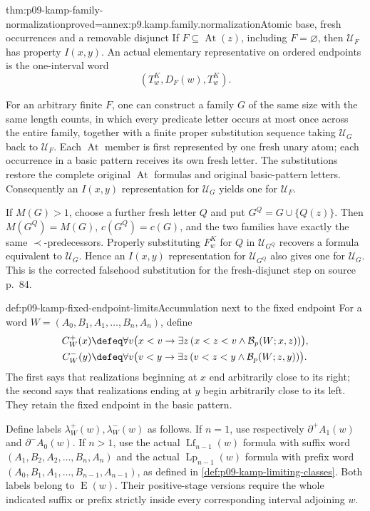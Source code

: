 \begin{hblemma}{thm:p09-kamp-family-normalization}{proved=annex:p9.kamp.family.normalization}{Atomic base, fresh occurrences and a removable disjunct}
If \(F\subseteq\operatorname{At}(z)\), including \(F=\varnothing\),
then \(\mathcal U_F\) has property \(I(x,y)\). An actual
elementary representative on ordered endpoints is the one-interval word
\[
                         (T^K_w,D_F(w),T^K_w).
\]

For an arbitrary finite \(F\), one can construct a family \(G\)
of the same size with the same length counts, in which every predicate
letter occurs at most once across the entire family, together with a
finite proper substitution sequence taking \(\mathcal U_G\)
back to \(\mathcal U_F\). Each \(\operatorname{At}\) member
is first represented by one fresh unary atom; each occurrence in a
basic pattern receives its own fresh letter. The substitutions restore
the complete original \(\operatorname{At}\) formulas and original
basic-pattern letters. Consequently an \(I(x,y)\) representation
for \(\mathcal U_G\) yields one for \(\mathcal U_F\).

If \(M(G)>1\), choose a further fresh letter \(Q\) and put
\(G^Q=G\cup\{Q(z)\}\). Then \(M(G^Q)=M(G)\), \(c(G^Q)=c(G)\),
and the two families have exactly the same \(\prec\)-predecessors.
Properly substituting \(F^K_w\) for \(Q\) in
\(\mathcal U_{G^Q}\) recovers a formula equivalent to
\(\mathcal U_G\). Hence an \(I(x,y)\) representation for
\(\mathcal U_{G^Q}\) also gives one for \(\mathcal U_G\).
This is the corrected falsehood substitution for the fresh-disjunct
step on source p.~84.
\end{hblemma}

\begin{hbdefinition}{def:p09-kamp-fixed-endpoint-limits}{Accumulation next to the fixed endpoint}
For a word \(W=(A_0,B_1,A_1,\ldots,B_n,A_n)\), define
\[
\begin{aligned}
 C_W^+(x)&\defeq\forall v\bigl(x<v\to
       \exists z\,(x<z<v\land\mathcal B_p(W;x,z))\bigr),\\
 C_W^-(y)&\defeq\forall v\bigl(v<y\to
       \exists z\,(v<z<y\land\mathcal B_p(W;z,y))\bigr).
\end{aligned}
\]
The first says that realizations beginning at \(x\) end
arbitrarily close to its right; the second says that realizations
ending at \(y\) begin arbitrarily close to its left.
They retain the fixed endpoint in the basic pattern.

Define labels \(\lambda_W^+(w),\lambda_W^-(w)\) as follows.
If \(n=1\), use respectively
\(\partial^+A_1(w)\) and \(\partial^-A_0(w)\).
If \(n>1\), use the actual \(\operatorname{Lf}_{n-1}(w)\)
formula with suffix word \((A_1,B_2,A_2,\ldots,B_n,A_n)\)
and the actual \(\operatorname{Lp}_{n-1}(w)\) formula with
prefix word \((A_0,B_1,A_1,\ldots,B_{n-1},A_{n-1})\),
as defined in \cref{def:p09-kamp-limiting-classes}.
Both labels belong to \(\operatorname{E}(w)\). Their
positive-stage versions require the whole indicated suffix or prefix
strictly inside every corresponding interval adjoining \(w\).
\end{hbdefinition}

